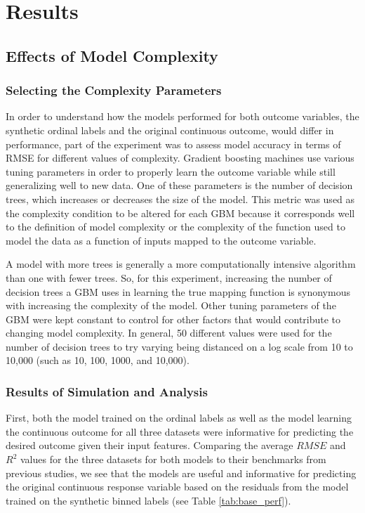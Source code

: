 \documentclass[10pt]{article}\usepackage[]{graphicx}\usepackage[]{xcolor}
\begin{document}
\section{Results}

\subsection{Effects of Model Complexity}
\subsubsection{Selecting the Complexity Parameters}
In order to understand how the models performed for both outcome variables, the synthetic ordinal labels and the original continuous outcome, would differ in performance, part of the experiment was to assess model accuracy in terms of RMSE for different values of complexity. Gradient boosting machines use various tuning parameters in order to properly learn the outcome variable while still generalizing well to new data. One of these parameters is the number of decision trees, which increases or decreases the size of the model. This metric was used as the complexity condition to be altered for each GBM because it corresponds well to the definition of model complexity or the complexity of the function used to model the data as a function of inputs mapped to the outcome variable. 

A model with more trees is generally a more computationally intensive algorithm than one with fewer trees. So, for this experiment, increasing the number of decision trees a GBM uses in learning the true mapping function is synonymous with increasing the complexity of the model. Other tuning parameters of the GBM were kept constant to control for other factors that would contribute to changing model complexity. In general, 50 different values were used for the number of decision trees to try varying being distanced on a log scale from 10 to 10,000 (such as 10, 100, 1000, and 10,000).

\subsubsection{Results of Simulation and Analysis}
First, both the model trained on the ordinal labels as well as the model learning the continuous outcome for all three datasets were informative for predicting the desired outcome given their input features. Comparing the average $RMSE$ and $R^2$ values for the three datasets for both models to their benchmarks from previous studies, we see that the models are useful and informative for predicting the original continuous response variable based on the residuals from the model trained on the synthetic binned labels (see Table \ref{tab:base_perf}).
\end{document}
